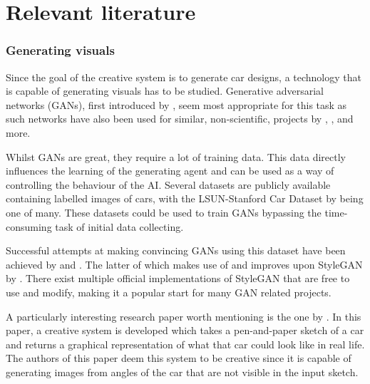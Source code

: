 \part{Relevant literature}
\label{part:literature}




\section{Generating visuals}
\label{sec:generating_visuals}

Since the goal of the creative system is to generate car designs, a technology that is capable of generating visuals has to be studied.
Generative adversarial networks (GANs), first introduced by \citet{gan_founder}, seem most appropriate for this task as such networks have also been used for similar, non-scientific, projects by \citet{gancar1}, \citet{gancar2}, \citet{gancar3} and more.

Whilst GANs are great, they require a lot of training data.
This data directly influences the learning of the generating agent and can be used as a way of controlling the behaviour of the AI.
Several datasets are publicly available containing labelled images of cars, with the LSUN-Stanford Car Dataset by \citet{cardb} being one of many.
These datasets could be used to train GANs bypassing the time-consuming task of initial data collecting.

Successful attempts at making convincing GANs using this dataset have been achieved by \citet{scientificcargan1} and \citet{scientificcargan2}.
The latter of which makes use of and improves upon StyleGAN by \citet{stylegan}.
There exist multiple official implementations of StyleGAN that are free to use and modify, making it a popular start for many GAN related projects.

A particularly interesting research paper worth mentioning is the one by \citet{creativecargan}.
In this paper, a creative system is developed which takes a pen-and-paper sketch of a car and returns a graphical representation of what that car could look like in real life.
The authors of this paper deem this system to be creative since it is capable of generating images from angles of the car that are not visible in the input sketch.


